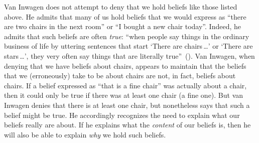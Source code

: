 \documentclass[11pt]{standalone}
\begin{document}
\begin{spacing}{1.5}
Van Inwagen does not attempt to deny that we hold beliefs like those
listed above.  He admits that many of us hold beliefs that we would
express as ``there are two chairs in the next room'' or ``I bought a
new chair today''.  Indeed, he admits that such beliefs are often {\em
  true}: ``when people say things in the ordinary business of life by
uttering sentences that start `There are chairs\,\ldots ' or `There
are stars\,\ldots ', they very often say things that are literally
true''~(\citeyear[102]{inwagen1995}).  Van Inwagen, when denying that
we have beliefs about chairs, appears to maintain that the beliefs
that we (erroneously) take to be about chairs are not, in fact,
beliefs about chairs.  If a belief expressed as ``that is a fine
chair'' was actually about a chair, then it could only be true if
there was at least one chair (a fine one).  But van Inwagen denies
that there is at least one chair, but nonetheless says that such a
belief might be true.  He accordingly recognizes the need to explain
what our beliefs really are about.  If he explains what the {\em
  content} of our beliefs is, then he will also be able to explain
{\em why} we hold such beliefs.


\begin{comment}
I will examine van Inwagen's arguments in section~\ref{inwagen}.
First, however, I want to discuss Unger's nihilism.  As mentioned
above, he does not attempt to maintain that our beliefs concerning
chairs are true.  He claims that any beliefs of the sorts listed above
are false, and necessarily so.  But we who do believe that there are
chairs---and that our beliefs concerning them are often true---may
reply that, even if such beliefs were false, there must be some reason
why we hold these beliefs.  Even `irrational' beliefs such as that
ghosts exist may be seen to have an explanation.  People who believe
that there are ghosts do so for reasons.  There are many more people
who believe that there are chairs than there are people who believe in
ghosts.  I think it is reasonable, therefore, to ask that Unger give
some explanation of why we believe that there are chairs, if there are
no such things.
\end{comment}

\ifstandalone
\end{spacing}


\fi
\end{document}
